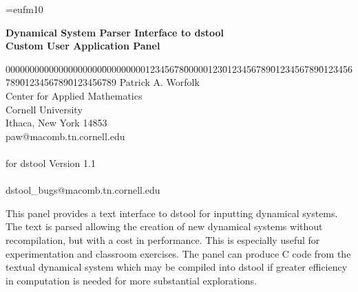 


\oddsidemargin 0.25in
\topmargin 0.25in
\headheight 0.25in

\textwidth 6in 
\headsep 0in
\textheight 8.25in

\font\setfont=eufm10




\begin{center}
{\LARGE \bf Dynamical System Parser Interface to dstool}  \\
\vspace{.15in}
{\large \bf Custom User Application Panel}
\end{center}

\vspace{.2in}
\begin{tabbing}
00000000000000000000\=00000000012345678\=00000123\=0123456789\=0123456789\=0123456789\=0123456789\=0123456789 \kill
{} \> Patrick A. Worfolk \\
\>	       \> Center for Applied Mathematics  \\
\>	       \> Cornell University \\
\>	       \> Ithaca, New York \hspace{.1in}  14853 \\
\>	       \> paw@macomb.tn.cornell.edu \\
\>	       \>   \\
 \hspace{.07in}  for dstool Version 1.1   \\
\>	       \>   \\
 \> dstool\_bugs@macomb.tn.cornell.edu
\end{tabbing}
\vspace{.2in}


	This panel provides a text interface to dstool for inputting dynamical
	systems. The text is parsed allowing the creation of new dynamical
	systems without recompilation, but with a cost in performance.
	This is especially useful for experimentation and classroom
	exercises.
	The panel can produce C code from the textual dynamical
	system which may be compiled into dstool if greater
	efficiency in computation is needed for more
	substantial explorations.
\vspace{.15in}

